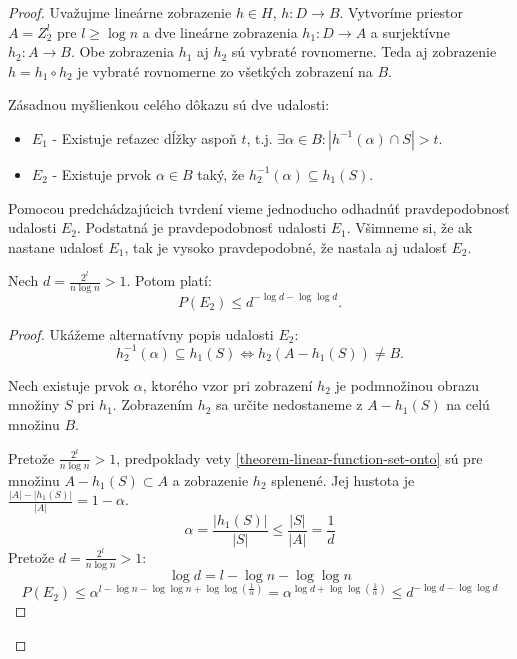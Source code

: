 \begin{proof}
Uvažujme lineárne zobrazenie $h \in H$, $h: D \rightarrow B$. Vytvoríme priestor $A = Z_2^l$ pre $l \geq \log n$ a dve lineárne zobrazenia $h_1: D \rightarrow A$ a surjektívne $h_2: A \rightarrow B$. Obe zobrazenia $h_1$ aj $h_2$ sú vybraté rovnomerne. Teda aj zobrazenie $h = h_1 \circ h_2$ je vybraté rovnomerne zo všetkých zobrazení na $B$.

Zásadnou myšlienkou celého dôkazu sú dve udalosti:
\begin{itemize}
\item $E_1$ - Existuje reťazec dĺžky aspoň $t$, t.j. $\exists \alpha \in B: | h^{-1}(\alpha) \cap S | > t$.
\item $E_2$ - Existuje prvok $\alpha \in B$ taký, že $h_2^{-1}(\alpha) \subseteq h_1(S)$.
\end{itemize}
Pomocou predchádzajúcich tvrdení vieme jednoducho odhadnúť pravdepodobnosť udalosti $E_2$. Podstatná je pravdepodobnosť udalosti $E_1$. Všimneme si, že ak nastane udalosť $E_1$, tak je vysoko pravdepodobné, že nastala aj udalosť $E_2$.

\begin{remark}
\label{remark-e2-probability}
Nech $d = \frac{2^l}{n \log n} > 1$. Potom platí:
\begin{displaymath}
P(E_2) \leq d^{-\log d - \log \log d}\textit{.}
\end{displaymath}
\end{remark}
\begin{proof}
Ukážeme alternatívny popis udalosti $E_2$:
\begin{displaymath}
h_2^{-1}(\alpha) \subseteq h_1(S) \Leftrightarrow h_2(A - h_1(S)) \neq B \textit{.}
\end{displaymath}

Nech existuje prvok $\alpha$, ktorého vzor pri zobrazení $h_2$ je podmnožinou obrazu množiny $S$ pri $h_1$. Zobrazením $h_2$ sa určite nedostaneme z $A - h_1(S)$ na celú množinu $B$.

Pretože $\frac{2^l}{n \log n} > 1$, predpoklady vety \ref{theorem-linear-function-set-onto} sú pre množinu $A - h_1(S) \subset A$ a zobrazenie $h_2$ splenené.
Jej hustota je $\frac{|A| - |h_1(S)|}{|A|} = 1 - \alpha$.
\begin{displaymath}
\alpha = \frac{|h_1(S)|}{|S|} \leq \frac{|S|}{|A|} = \frac{1}{d}
\end{displaymath}
Pretože $d = \frac{2^l}{n \log n} > 1$:
\begin{displaymath}
\log d = l - \log n - \log \log n
\end{displaymath}
\begin{displaymath}
P(E_2) \leq \alpha^{l - \log n - \log \log n + \log \log \left(\frac{1}{\alpha}\right)} = \alpha ^ {\log d + \log \log \left(\frac{1}{\alpha}\right)} \leq d^{-\log d - \log \log d}
\end{displaymath}
\end{proof}


\end{proof}
